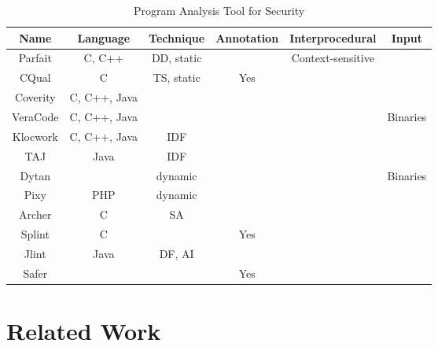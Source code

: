 \newcommand{\parfait}{\texttt{Parfait}\xspace}
\newcommand{\cqual}{\texttt{CQual}\xspace}
\newcommand{\dytan}{\texttt{Dytan}\xspace}
\newcommand{\pixy}{\texttt{Pixy}\xspace}
\newcommand{\ardilla}{\texttt{ARDILLA}\xspace}
\newcommand{\taintcheck}{\texttt{TaintCheck}\xspace}

\newcommand{\datalog}{\texttt{Datalog}\xspace}
\newcommand{\bddbddb}{\texttt{bddbddb}\xspace}
\newcommand{\pql}{\texttt{PQL}\xspace}

\begin{table*}[!htbp]
\centering
\begin{tabular}{|c|c|c|c|c|c|}
\hline
{\bf Name} & {\bf Language}	& {\bf Technique } &	{\bf Annotation}	& {\bf Interprocedural} & {\bf Input}  \\ \hline
Parfait	    &	C, C++		&	DD,	static		&						&	Context-sensitive	&				\\
CQual	 	&	C			&	TS, static		&	Yes					&						&   			\\
Coverity	& C, C++, Java  &					&						&						&				\\
VeraCode	& C, C++, Java  &					&						&						&	Binaries	\\
Klocwork	& C, C++, Java  &	IDF				&						&						&				\\
TAJ			& Java  		&	IDF				&						&						&				\\
Dytan		&				&	dynamic			&						&						&	Binaries	\\
Pixy		&	PHP			&	dynamic			&						&						&				\\
Archer	 	&	C			&	SA				&						&						&   			\\
Splint		&	C			&					&	Yes					&						&				\\
Jlint		&	Java		&	DF, AI			&						&						&				\\
Safer		&				&					&	Yes					&						&				\\ \hline
\end{tabular}\caption{Program Analysis Tool for Security}
\end{table*}

\section{Related Work}\label{sec:related}

